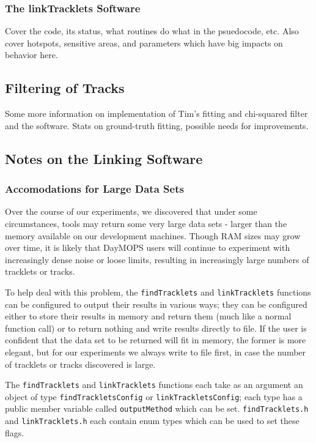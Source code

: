 \subsubsection{The linkTracklets Software}
Cover the code, its status, what routines do what in the psuedocode,
etc.  Also cover hotspots, sensitive areas, and parameters which have
big impacts on behavior here.


\subsection{Filtering of Tracks}
Some more information on implementation of Tim's fitting and
chi-squared filter and the software. Stats on ground-truth fitting,
possible needs for improvements.


\subsection{Notes on the Linking Software}

\subsubsection{Accomodations for Large Data Sets}
\label{largeData}
Over the course of our experiments, we discovered that under some
circumstances, tools may return some very large data sets - larger
than the memory available on our development machines.  Though RAM
sizes may grow over time, it is likely that DayMOPS users will
continue to experiment with increasingly dense noise or loose limits,
resulting in increasingly large numbers of tracklets or tracks.

To help deal with this problem, the {\tt  findTracklets} and
{\tt linkTracklets} functions can be configured to output their results
in various ways; they can be configured either to store their results
in memory and return them (much like a normal function call) or to
return nothing and write results directly to file.  If the user is
confident that the data set to be returned will fit in memory, the
former is more elegant, but for our experiments we always write to
file first, in case the number of tracklets or tracks discovered is
large.

The {\tt findTracklets} and {\tt linkTracklets} functions each take as
an argument an object of type {\tt findTrackletsConfig} or
{\tt linkTrackletsConfig}; each type has a public member variable
called {\tt outputMethod} which can be set.  {\tt findTracklets.h} and
{\tt linkTracklets.h} each contain enum types which can be used to set
these flags.

